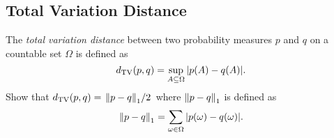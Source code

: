     \subsection{Total Variation Distance}
        The \emph{total variation distance} between two probability measures \(p\) and \(q\) on a countable set \(\Omega\) is defined as
        \begin{equation}
            d_\mathrm{TV}(p, q) = \sup_{A \subseteq \Omega} \abs{p(A) - q(A)}.
        \end{equation}
        Show that \(d_\mathrm{TV}(p, q) = \flatfrac{\norm{p - q}_1}{2}\) where \(\norm{p - q}_1\) is defined as
        \begin{equation}
            \norm{p - q}_1 = \sum_{\omega \in \Omega} \abs{p(\omega) - q(\omega)}.
        \end{equation}

